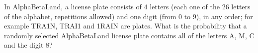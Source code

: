 In AlphaBetaLand, a license plate consists of $4$ letters (each one of the $26$ letters of the alphabet, repetitions allowed) and one digit (from $0$ to $9$), in any order; for example TRA1N, TRAI1 and 1RAIN are plates. What is the probability that a randomly selected AlphaBetaLand license plate contains all of the letters A, M, C and the digit $8$?
